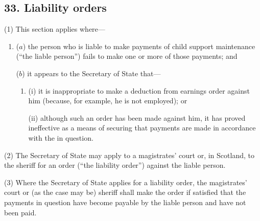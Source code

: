 \documentclass[a4paper]{article}
\begin{document}

\subsection{33. Liability orders}

(1) This section applies where---
\begin{enumerate}\item[]
($a$) the person who is liable to make payments of child support maintenance (“the liable person”) fails to make one or more of those payments; and

($b$) it appears to the Secretary of State that---
\begin{enumerate}\item[]
(i)
it is inappropriate to make a deduction from earnings order against him (because, for example, he is not employed); or

(ii)
although such an order has been made against him, it has proved ineffective as a means of securing that payments are made in accordance with the  in question.
\end{enumerate}
\end{enumerate}

(2)
The Secretary of State may apply to a magistrates’ court or, in Scotland, to the sheriff for an order (“the liability order”) against the liable person.

(3)
Where the Secretary of State applies for a liability order, the magistrates’ court or (as the case may be) sheriff shall make the order if satisfied that the payments in question have become payable by the liable person and have not been paid.
\end{document}
